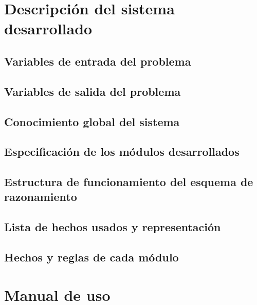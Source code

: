 \documentclass[11pt,leqno]{article}
\theoremstyle{definition_wo_parentheses}
\theoremstyle{plain}
\theoremstyle{remark}
\begin{document}
\section{Descripción del sistema desarrollado}

\subsection{Variables de entrada del problema}
\subsection{Variables de salida del problema}
\subsection{Conocimiento global del sistema}
\subsection{Especificación de los módulos desarrollados}
\subsection{Estructura de funcionamiento del esquema de razonamiento}
\subsection{Lista de hechos usados y representación}
\subsection{Hechos y reglas de cada módulo}


\section{Manual de uso}
\end{document}
